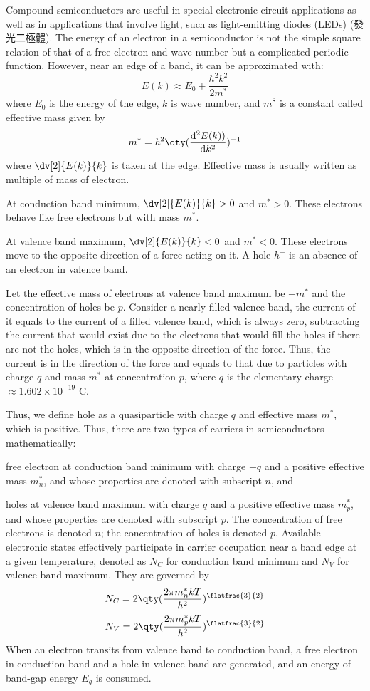 \documentclass[a4paper,12pt]{report}
\begin{document}
Compound semiconductors are useful in special electronic circuit applications as well as in applications that involve light, such as light-emitting diodes (LEDs) (發光二極體).
The energy of an electron in a semiconductor is not the simple square relation of that of a free electron and wave number but a complicated periodic function. However, near an edge of a band, it can be approximated with:
\[E(k) \approx E_0 + \frac{\hbar^2 k^2}{2m^*}\]
where $E_0$ is the energy of the edge, $k$ is wave number, and $m^8$ is a constant called effective mass given by
\[m^*=\hbar^2\qty(\frac{\mathrm{d}^2E(k))}{\mathrm{d}k^2})^{-1}\]
where $\dv[2]{E(k)}{k}$ is taken at the edge. Effective mass is usually written as multiple of mass of electron.
\bit
\item At conduction band minimum, $\dv[2]{E(k)}{k}>0$ and $m^*>0$. These electrons behave like free electrons but with mass $m^*$.
\item At valence band maximum, $\dv[2]{E(k)}{k}<0$ and $m^*<0$. These electrons move to the opposite direction of a force acting on it.
\eit
{}
A hole $h^+$ is an absence of an electron in valence band.

Let the effective mass of electrons at valence band maximum be $-m^*$ and the concentration of holes be $p$. Consider a nearly-filled valence band, the current of it equals to the current of a filled valence band, which is always zero, subtracting the current that would exist due to the electrons that would fill the holes if there are not the holes, which is in the opposite direction of the force. Thus, the current is in the direction of the force and equals to that due to particles with charge $q$ and mass $m^*$ at concentration $p$, where $q$ is the elementary charge $\approx1.602\times 10^{-19}$ C.

Thus, we define hole as a quasiparticle with charge $q$ and effective mass $m^*$, which is positive.
Thus, there are two types of carriers in semiconductors mathematically:
\bit
\item free electron at conduction band minimum with charge $-q$ and a positive effective mass $m_n^*$, and whose properties are denoted with subscript $n$, and
\item holes at valence band maximum with charge $q$ and a positive effective mass $m_p^*$, and whose properties are denoted with subscript $p$.
\eit
The concentration of free electrons is denoted $n$; the concentration of holes is denoted $p$.
Available electronic states effectively participate in carrier occupation near a band edge at a given temperature, denoted as $N_C$ for conduction band minimum and $N_V$ for valence band maximum. They are governed by
\[N_C=2\qty(\frac{2\pi m_n^*kT}{h^2})^{\flatfrac{3}{2}}\]
\[N_V=2\qty(\frac{2\pi m_p^*kT}{h^2})^{\flatfrac{3}{2}}\]
When an electron transits from valence band to conduction band, a free electron in conduction band and a hole in valence band are generated, and an energy of band-gap energy $E_g$ is consumed.
\end{document}
